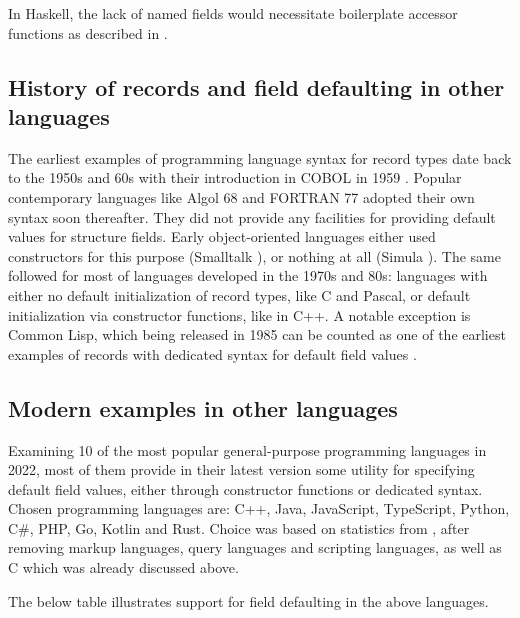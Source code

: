 \documentclass[en]{pracamgr}
\begin{document}
In Haskell, the lack of named fields would necessitate boilerplate accessor functions as described in \cite{WikibooksHaskellDatatypes}.

\subsection{History of records and field defaulting in other languages}
The earliest examples of programming language syntax for record types date back to the 1950s and 60s with their introduction in COBOL in 1959 \cite{sebesta1996concepts}.
Popular contemporary languages like Algol 68 \cite{van2012revised} and FORTRAN 77 \cite{fortran77} adopted their own syntax soon thereafter.
They did not provide any facilities for providing default values for structure fields.
Early object-oriented languages either used constructors for this purpose (Smalltalk \cite{smalltalk80}), or nothing at all (Simula \cite{Simula67}).
The same followed for most of languages developed in the 1970s and 80s: languages with either no default initialization of record types, like C and Pascal,
or default initialization via constructor functions, like in C++.
A notable exception is Common Lisp, which being released in 1985 can be counted 
as one of the earliest examples of records with dedicated syntax for default field values \cite{CommonLisp}.
\subsection{Modern examples in other languages}
Examining 10 of the most popular general-purpose programming languages in 2022,
most of them provide in their latest version some utility for specifying default field values,
either through constructor functions or dedicated syntax.
Chosen programming languages are: C++, Java, JavaScript, TypeScript, Python, C\#, PHP, Go, Kotlin and Rust.
Choice was based on statistics from \cite{StatistaProgLangs}, after removing markup languages, 
query languages and scripting languages, as well as C which was already discussed above.

The below table illustrates support for field defaulting in the above languages.
\end{document}
